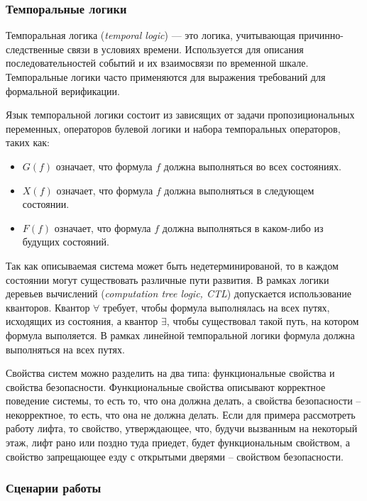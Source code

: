 \documentclass[14pt]{article}
\begin{document}
\subsubsection{Темпоральные логики}

Темпоральная логика (\textit{temporal logic}) \cite{tl} --- это логика, учитывающая причинно-следственные связи в условиях времени.
Используется для описания последовательностей событий и их взаимосвязи по временной шкале.
Темпоральные логики часто применяются для выражения требований для формальной верификации.

Язык темпоральной логики состоит из зависящих от задачи
пропозициональных переменных, операторов булевой логики и набора темпоральных
операторов, таких как:

\begin{itemize}
    \item $G(f)$ означает, что формула $f$ должна выполняться во всех состояниях.
    \item $X(f)$ означает, что формула $f$ должна выполняться в следующем состоянии.
    \item $F(f)$ означает, что формула $f$ должна выполняться в каком-либо из будущих состояний.
\end{itemize}

Так как описываемая система может быть недетерминированой, то в каждом
состоянии могут существовать различные пути развития. В рамках логики
деревьев вычислений (\textit{computation tree logic, CTL}) допускается использование кванторов. Квантор $\forall$
требует, чтобы формула выполнялась на всех путях, исходящих из состояния, а
квантор $\exists$, чтобы существовал такой путь, на котором формула выполяется.
В рамках линейной темпоральной логики формула должна выполняться на всех путях.

Свойства систем можно разделить на два типа: функциональные свойства и свойства безопасности.
Функциональные свойства описывают корректное поведение системы, то есть то, что она должна делать,
а свойства безопасности -- некорректное, то есть, что она не должна делать. Если для примера рассмотреть работу лифта,
то свойство, утверждающее, что, будучи вызванным на некоторый этаж, лифт рано или поздно туда приедет, будет
функциональным свойством, а свойство запрещающее езду с открытыми дверями -- свойством безопасности.

\subsubsection{Сценарии работы}
\end{document}
